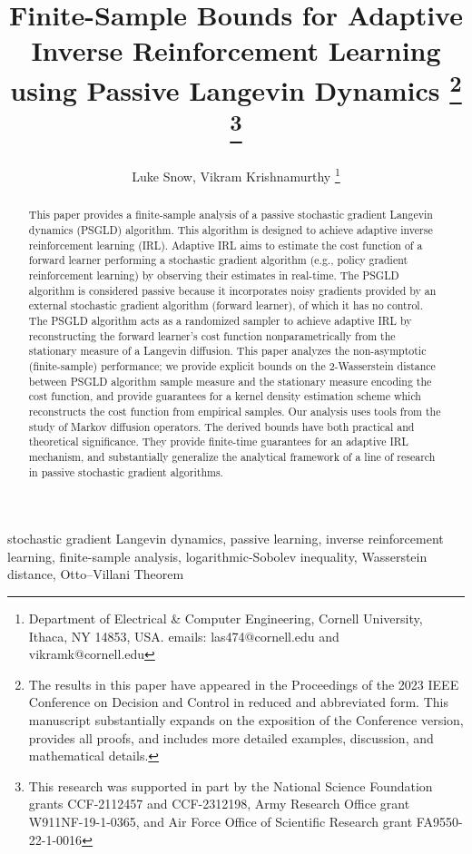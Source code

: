 \documentclass[journal,onecolumn]{IEEEtran}
\title{Finite-Sample Bounds for Adaptive Inverse Reinforcement Learning using Passive Langevin Dynamics
\thanks{The results in this paper have appeared in the Proceedings of the 2023 IEEE Conference on Decision and Control in reduced and abbreviated form. This manuscript substantially expands on the exposition of the Conference version, provides all proofs, and includes more detailed examples, discussion, and mathematical details.}
\thanks{This research was supported in part by the National Science Foundation grants CCF-2112457 and CCF-2312198, Army Research Office grant W911NF-19-1-0365, and Air Force Office of Scientific Research grant FA9550-22-1-0016}}
\author{Luke Snow,  Vikram Krishnamurthy \thanks{Department of Electrical \& Computer Engineering, Cornell University, Ithaca, NY 14853, USA.  emails: las474@cornell.edu and vikramk@cornell.edu}}
\begin{document}
\maketitle

\begin{abstract} 
    This paper provides a finite-sample analysis of a passive stochastic gradient Langevin dynamics (PSGLD) algorithm. This algorithm is designed to achieve adaptive inverse reinforcement learning (IRL). Adaptive IRL aims to estimate the cost function of a forward learner performing a stochastic gradient algorithm (e.g., policy gradient reinforcement learning) by observing their estimates in real-time.
    The PSGLD algorithm is considered passive because it incorporates noisy gradients provided by an external stochastic gradient algorithm (forward learner), of which it has no control. The PSGLD algorithm acts as a randomized sampler to achieve adaptive IRL by reconstructing the forward learner's cost function nonparametrically from the stationary measure of a Langevin diffusion. 
    This paper analyzes the non-asymptotic (finite-sample) performance; we provide explicit bounds on the 2-Wasserstein distance between PSGLD algorithm sample measure and the stationary measure encoding the cost function{\color{black}, and provide guarantees for a kernel density estimation scheme which reconstructs the cost function from empirical samples.} Our analysis uses {\color{black}tools from the study of Markov diffusion operators}. 
    The derived bounds have both practical and theoretical significance. They provide finite-time guarantees for an adaptive IRL mechanism, and substantially generalize the analytical framework of a line of research in passive stochastic gradient algorithms.
\end{abstract}



\begin{IEEEkeywords}
stochastic gradient Langevin dynamics, passive learning, inverse reinforcement learning, finite-sample analysis, logarithmic-Sobolev inequality, Wasserstein distance, Otto--Villani Theorem
\end{IEEEkeywords}
\end{document}
